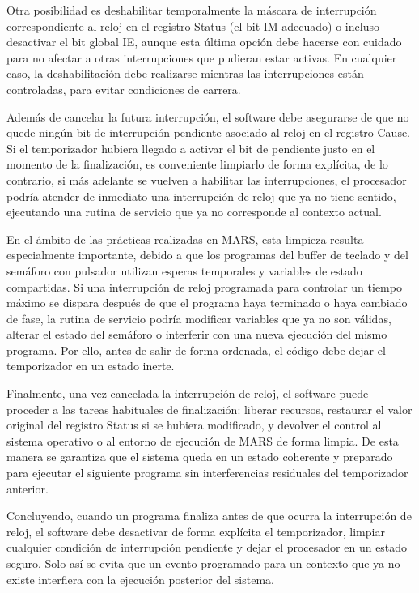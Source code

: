 \documentclass[12pt, letterpaper]{article}
\begin{document}
Otra posibilidad es deshabilitar temporalmente la máscara de interrupción correspondiente al reloj en el registro Status (el bit IM adecuado) o incluso desactivar el bit global IE, aunque esta última opción debe hacerse con cuidado para no afectar a otras interrupciones que pudieran estar activas. En cualquier caso, la deshabilitación debe realizarse mientras las interrupciones están controladas, para evitar condiciones de carrera.

Además de cancelar la futura interrupción, el software debe asegurarse de que no quede ningún bit de interrupción pendiente asociado al reloj en el registro Cause. Si el temporizador hubiera llegado a activar el bit de pendiente justo en el momento de la finalización, es conveniente limpiarlo de forma explícita, de lo contrario, si más adelante se vuelven a habilitar las interrupciones, el procesador podría atender de inmediato una interrupción de reloj que ya no tiene sentido, ejecutando una rutina de servicio que ya no corresponde al contexto actual.

En el ámbito de las prácticas realizadas en MARS, esta limpieza resulta especialmente importante, debido a que los programas del buffer de teclado y del semáforo con pulsador utilizan esperas temporales y variables de estado compartidas. Si una interrupción de reloj programada para controlar un tiempo máximo se dispara después de que el programa haya terminado o haya cambiado de fase, la rutina de servicio podría modificar variables que ya no son válidas, alterar el estado del semáforo o interferir con una nueva ejecución del mismo programa. Por ello, antes de salir de forma ordenada, el código debe dejar el temporizador en un estado inerte.

Finalmente, una vez cancelada la interrupción de reloj, el software puede proceder a las tareas habituales de finalización: liberar recursos, restaurar el valor original del registro Status si se hubiera modificado, y devolver el control al sistema operativo o al entorno de ejecución de MARS de forma limpia. De esta manera se garantiza que el sistema queda en un estado coherente y preparado para ejecutar el siguiente programa sin interferencias residuales del temporizador anterior.

Concluyendo, cuando un programa finaliza antes de que ocurra la interrupción de reloj, el software debe desactivar de forma explícita el temporizador, limpiar cualquier condición de interrupción pendiente y dejar el procesador en un estado seguro. Solo así se evita que un evento programado para un contexto que ya no existe interfiera con la ejecución posterior del sistema.\newpage
\end{document}
